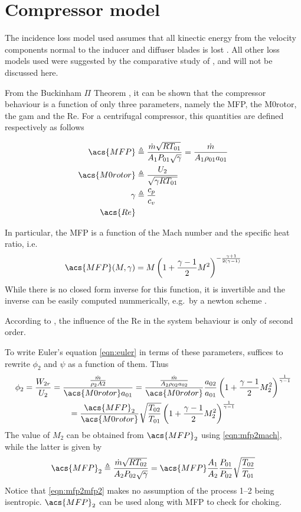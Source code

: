 \documentclass[tcc]{subfiles}
\begin{document}
\section{Compressor model}

The incidence loss model used assumes that all kinectic energy from the velocity components
normal to the inducer and diffuser blades is lost \cite{Stanitz1953}.
All other loss models used were suggested by the comparative study of \textcite{Oh1997}, 
and will not be discussed here.



From the Buckinham $\Pi$ Theorem \cite{Buckingham1914}, 
it can be shown that the compressor behaviour is a function of only three parameters, 
namely the \acl{MFP}, the \acl{M0rotor}, the \acl{gam} and the \acl{Re}. 
For a centrifugal compressor, this quantities are defined respectively as follows

\begin{align}
    \acs{MFP} &\triangleq \MFP{1} = \MFPalt{1} \\
    \acs{M0rotor} &\triangleq \frac{U_2}{\sqrt{\gamma R T_{01}}} \\
    \gamma &\triangleq \frac{c_p}{c_v} \\
    \acs{Re} &
\end{align}

In particular, the \acl{MFP} is a function of the Mach number and the specific heat ratio,
 i.e.\
\begin{equation}
    \label{eqn:mfp2mach}
    \acs{MFP}(M,\gamma) = M \left( 1 + \frac{\gamma-1}{2}M^2\right)^{-\frac{\gamma+1}{2(\gamma-1)}}
\end{equation}
While there is no closed form inverse for this function, it is invertible and the inverse can be easily computed nummerically, e.g.\ by a newton scheme \cite{Der1974}.

According to \textcite{walsh2004gas},
 the influence of the \acl{Re} in the system behaviour is only of second order.

To write Euler's equation \cref{eqn:euler} in terms of these parameters, suffices to rewrite $\phi_2$ and $\psi$ as a function of them. Thus
\begin{multline}
    \label{eqn:phi2_dimensionless}
    \phi_2 = \frac{W_{2r}}{U_2} 
           = \frac{\frac{\dot{m}}{\rho_2 A2}}{\acs{M0rotor} a_{01}}
           = \frac{\MFPalt{2}}{\acs{M0rotor}} \frac{a_{02}}{a_{01}} \stagdensratio{2} \\ 
           = \frac{\acs{MFP}_2}{\acs{M0rotor}} \sqrt{\frac{T_{02}}{T_{01}}} \stagdensratio{2}
\end{multline}
The value of $M_2$ can be obtained from $\acs{MFP}_2$ using \cref{eqn:mfp2mach}, while the latter is given by
\begin{equation}
    \label{eqn:mfp2mfp2}
    \acs{MFP}_2 \triangleq \MFP{2} = \acs{MFP} \frac{A_1}{A_2} \frac{P_{01}}{P_{02}} \sqrt{\frac{T_{02}}{T_{01}}}
\end{equation}
Notice that \cref{eqn:mfp2mfp2} makes no assumption of the process 1--2 being isentropic. $\acs{MFP}_2$ can be used along with \acs{MFP} to check for choking.
\end{document}
